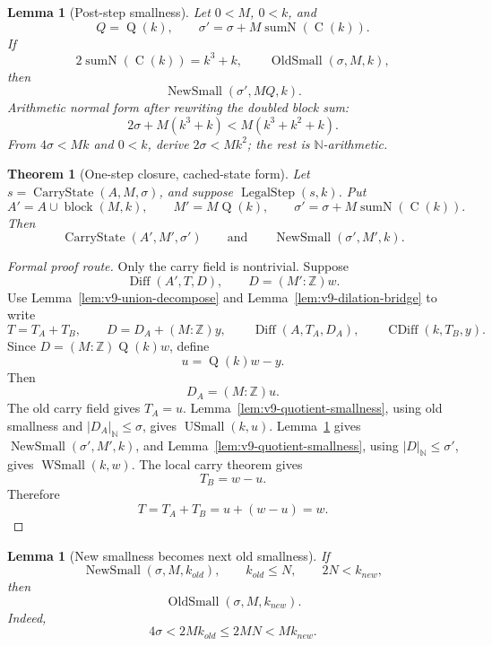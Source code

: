 \documentclass[11pt]{article}
\theoremstyle{definition}
\theoremstyle{plain}
\newtheorem{theorem}[definition]{Theorem}
\newtheorem{lemma}[definition]{Lemma}
\theoremstyle{remark}
\newcommand{\N}{\mathbb{N}}
\newcommand{\Z}{\mathbb{Z}}
\newcommand{\nabs}[1]{\left|#1\right|_{\N}}
\newcommand{\SumN}{\operatorname{sumN}}
\newcommand{\Diff}{\operatorname{Diff}}
\newcommand{\Cblock}{\operatorname{C}}
\newcommand{\Qfun}{\operatorname{Q}}
\newcommand{\CDiff}{\operatorname{CDiff}}
\newcommand{\USmall}{\operatorname{USmall}}
\newcommand{\WSmall}{\operatorname{WSmall}}
\newcommand{\OldSmall}{\operatorname{OldSmall}}
\newcommand{\NewSmall}{\operatorname{NewSmall}}
\newcommand{\CarryState}{\operatorname{CarryState}}
\newcommand{\LegalStep}{\operatorname{LegalStep}}
\newcommand{\block}{\operatorname{block}}
\begin{document}
\begin{lemma}[Post-step smallness]\label{lem:v9-post-step-smallness}
Let \(0<M\), \(0<k\), and
\[
        Q=\Qfun(k),
        \qquad
        \sigma'=\sigma+M\SumN(\Cblock(k)).
\]
If
\[
        2\SumN(\Cblock(k))=k^3+k,
        \qquad
        \OldSmall(\sigma,M,k),
\]
then
\[
        \NewSmall(\sigma',MQ,k).
\]
Arithmetic normal form after rewriting the doubled block sum:
\[
        2\sigma+M(k^3+k)<M(k^3+k^2+k).
\]
From \(4\sigma<Mk\) and \(0<k\), derive \(2\sigma<Mk^2\); the rest is \(\N\)-arithmetic.
\end{lemma}

\begin{theorem}[One-step closure, cached-state form]\label{thm:v9-closure-step}
Let \(s=\CarryState(A,M,\sigma)\), and suppose \(\LegalStep(s,k)\).  Put
\[
        A'=A\cup\block(M,k),
        \qquad
        M'=M\Qfun(k),
        \qquad
        \sigma'=\sigma+M\SumN(\Cblock(k)).
\]
Then
\[
        \CarryState(A',M',\sigma')
        \qquad\text{and}\qquad
        \NewSmall(\sigma',M',k).
\]
\end{theorem}

\begin{proof}[Formal proof route]
Only the carry field is nontrivial.  Suppose
\[
        \Diff(A',T,D),
        \qquad D=(M':\Z)w.
\]
Use Lemma~\ref{lem:v9-union-decompose} and Lemma~\ref{lem:v9-dilation-bridge} to write
\[
        T=T_A+T_B,
        \qquad
        D=D_A+(M:\Z)y,
        \qquad
        \Diff(A,T_A,D_A),
        \qquad
        \CDiff(k,T_B,y).
\]
Since \(D=(M:\Z)\Qfun(k)w\), define
\[
        u=\Qfun(k)w-y.
\]
Then
\[
        D_A=(M:\Z)u.
\]
The old carry field gives \(T_A=u\).  Lemma~\ref{lem:v9-quotient-smallness}, using old smallness and \(\nabs{D_A}\le\sigma\), gives \(\USmall(k,u)\).  Lemma~\ref{lem:v9-post-step-smallness} gives \(\NewSmall(\sigma',M',k)\), and Lemma~\ref{lem:v9-quotient-smallness}, using \(\nabs D\le\sigma'\), gives \(\WSmall(k,w)\).  The local carry theorem gives
\[
        T_B=w-u.
\]
Therefore
\[
        T=T_A+T_B=u+(w-u)=w.
\]
\end{proof}

\begin{lemma}[New smallness becomes next old smallness]\label{lem:v9-new-to-old}
If
\[
        \NewSmall(\sigma,M,k_{old}),
        \qquad
        k_{old}\le N,
        \qquad
        2N<k_{new},
\]
then
\[
        \OldSmall(\sigma,M,k_{new}).
\]
Indeed,
\[
        4\sigma<2Mk_{old}\le2MN<Mk_{new}.
\]
\end{lemma}
\end{document}
